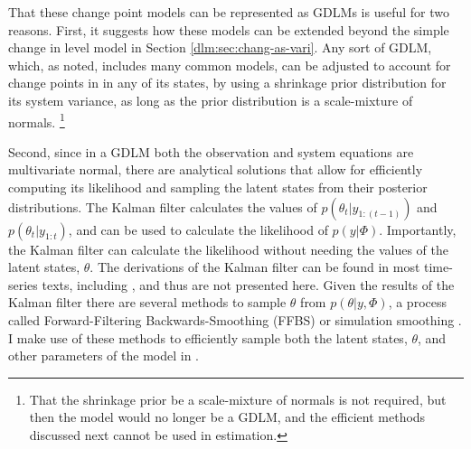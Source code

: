 That these change point models can be represented as GDLMs is useful for two reasons.
First, it suggests how these models can be extended beyond the simple change in level model in Section \ref{dlm:sec:chang-as-vari}.
Any sort of GDLM, which, as noted, includes many common models, can be adjusted to account for change points in in any of its states, by using a shrinkage prior distribution for its system variance, as long as the prior distribution is a scale-mixture of normals.%
\footnote{That the shrinkage prior be a scale-mixture of normals is not required, but then the model would no longer be a GDLM, and the efficient methods discussed next cannot be used in estimation.}

Second, since in a GDLM both the observation and system equations are multivariate normal, there are analytical solutions that allow for efficiently computing its likelihood and sampling the latent states from their posterior distributions.
The Kalman filter calculates the values of $p(\theta_{t} | y_{1:(t-1)})$  and $p(\theta_{t}| y_{1:t})$, and can be used to calculate the likelihood of $p(y | \Phi)$.
Importantly, the Kalman filter can calculate the likelihood without needing the values of the latent states, $\theta$.
The derivations of the Kalman filter can be found in most time-series texts, including \textcites[Ch. 5--7]{DurbinKoopman2012}{WestHarrison1997}, and thus are not presented here.
Given the results of the Kalman filter there are several methods to sample $\theta$ from $p(\theta | y, \Phi)$, a process called Forward-Filtering Backwards-Smoothing (FFBS) or simulation smoothing \parencites{CarterKohn1994}{Fruehwirth-Schnatter1994}{DeJongShephard1995}{DurbinKoopman2002}[Ch 4.9]{DurbinKoopman2012}.
I make use of these methods to efficiently sample both the latent states, $\theta$, and other parameters of the model in \Stan{}.


